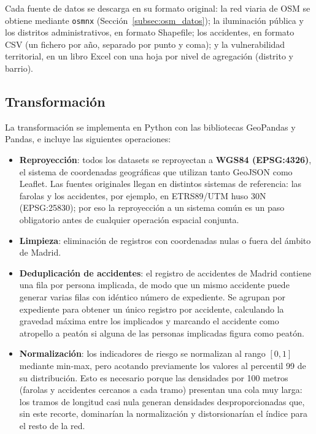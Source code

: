 Cada fuente de datos se descarga en su formato original: la red viaria de OSM se obtiene mediante \texttt{osmnx} (Sección~\ref{subsec:osm_datos}); la iluminación pública y los distritos administrativos, en formato Shapefile; los accidentes, en formato CSV (un fichero por año, separado por punto y coma); y la vulnerabilidad territorial, en un libro Excel con una hoja por nivel de agregación (distrito y barrio).

\subsection{Transformación}
\label{subsec:transformacion}

La transformación se implementa en Python con las bibliotecas GeoPandas y Pandas, e incluye las siguientes operaciones:

\begin{itemize}
    \item \textbf{Reproyección}: todos los datasets se reproyectan a \textbf{WGS84 (EPSG:4326)}, el sistema de coordenadas geográficas que utilizan tanto GeoJSON como Leaflet. Las fuentes originales llegan en distintos sistemas de referencia: las farolas y los accidentes, por ejemplo, en ETRS89/UTM huso 30N (EPSG:25830); por eso la reproyección a un sistema común es un paso obligatorio antes de cualquier operación espacial conjunta.
    \item \textbf{Limpieza}: eliminación de registros con coordenadas nulas o fuera del ámbito de Madrid.
    \item \textbf{Deduplicación de accidentes}: el registro de accidentes de Madrid contiene una fila por persona implicada, de modo que un mismo accidente puede generar varias filas con idéntico número de expediente. Se agrupan por expediente para obtener un único registro por accidente, calculando la gravedad máxima entre los implicados y marcando el accidente como atropello a peatón si alguna de las personas implicadas figura como peatón.
    \item \textbf{Normalización}: los indicadores de riesgo se normalizan al rango $[0, 1]$ mediante min-max, pero acotando previamente los valores al percentil 99 de su distribución. Esto es necesario porque las densidades por 100 metros (farolas y accidentes cercanos a cada tramo) presentan una cola muy larga: los tramos de longitud casi nula generan densidades desproporcionadas que, sin este recorte, dominarían la normalización y distorsionarían el índice para el resto de la red.
\end{itemize}

